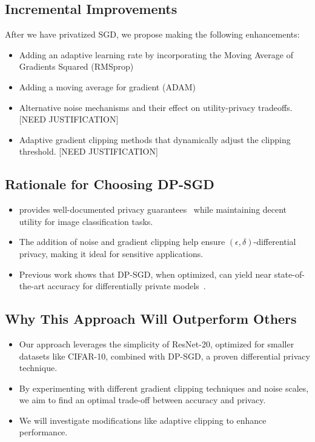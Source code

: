 \documentclass{article}
\begin{document}
    \subsection{Incremental Improvements}\label{subsec:incremental-improvements}
    After we have privatized SGD, we propose making the following enhancements:
    \begin{itemize}
        \item Adding an adaptive learning rate by incorporating the Moving Average of Gradients Squared (RMSprop)~\cite{DBLP:journals/corr/abs-1807-06766}
        \item Adding a moving average for gradient (ADAM)~\cite{DBLP:journals/corr/abs-1807-06766}
        \item Alternative noise mechanisms and their effect on utility-privacy tradeoffs. [NEED JUSTIFICATION]
        \item Adaptive gradient clipping methods that dynamically adjust the clipping threshold. [NEED JUSTIFICATION]
    \end{itemize}

    \subsection{Rationale for Choosing DP-SGD}\label{subsec:rationale-for-choosing-dp-sgd}
    \begin{itemize}
        \item provides well-documented privacy guarantees~\cite{Abadi_2016_DeepLearningDifferentialPrivacy}
        while maintaining decent utility for image classification tasks.
        \item The addition of noise and gradient clipping help ensure $(\epsilon, \delta)$-differential privacy,
        making it ideal for sensitive applications.
        \item Previous work shows that DP-SGD, when optimized, can yield near state-of-the-art accuracy
        for differentially private models~\cite{De_2022_ScaleDP_ImageClassification}.
    \end{itemize}

    \subsection{Why This Approach Will Outperform Others}\label{subsec:why-this-approach-will-outperform-others}
    \begin{itemize}
        \item Our approach leverages the simplicity of ResNet-20, optimized for smaller datasets like CIFAR-10,
        combined with DP-SGD, a proven differential privacy technique.
        \item By experimenting with different gradient clipping techniques and noise scales,
        we aim to find an optimal trade-off between accuracy and privacy.
        \item We will investigate modifications like adaptive clipping to enhance performance.
    \end{itemize}
\end{document}
